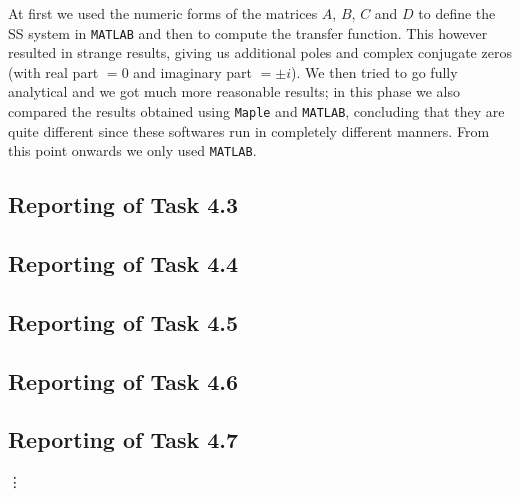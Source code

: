 \documentclass[11pt]{article}
\begin{document}
At first we used the numeric forms of the matrices $A$, $B$, $C$ and $D$ to define the SS system in \texttt{MATLAB} and then to compute the transfer function. This however resulted in strange results, giving us additional poles and complex conjugate zeros (with real part $=0$ and imaginary part $=\pm i$). We then tried to go fully analytical and we got much more reasonable results; in this phase we also compared the results obtained using \texttt{Maple} and \texttt{MATLAB}, concluding that they are quite different since these softwares run in completely different manners. From this point onwards we only used \texttt{MATLAB}. 
\subsection*{Reporting of Task 4.3}


\subsection*{Reporting of Task 4.4}


\subsection*{Reporting of Task 4.5}


\subsection*{Reporting of Task 4.6}


\subsection*{Reporting of Task 4.7}

\vdots
\end{document}
